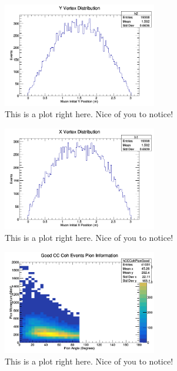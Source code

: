 \documentclass[11pt]{article}
\begin{document}
\begin{figure}[H]
\centering
\includegraphics[width=0.6\textwidth]{NewANMReinSehgalImages/3-YVertexDistributionANMRS.png}
\caption{This is a plot right here. Nice of you to notice!}
\end{figure}

\begin{figure}[H]
\centering
\includegraphics[width=0.6\textwidth]{NewANMReinSehgalImages/4-XVertexDistributionANMRS.png}
\caption{This is a plot right here. Nice of you to notice!}
\end{figure}

\begin{figure}[H]
\centering
\includegraphics[width=0.6\textwidth]{NewANMReinSehgalImages/5-GoodCCCohPionInfoANMRS.png}
\caption{This is a plot right here. Nice of you to notice!}
\end{figure}
\end{document}
